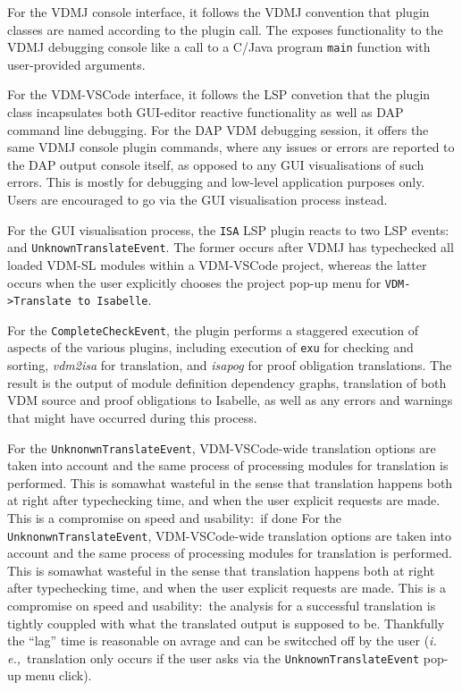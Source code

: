 \documentclass[runningheads,a4paper]{llncs}
\newcommand{\ie}{{\em i.\,e.,\/}}
\begin{document}
For the VDMJ console interface, it follows the VDMJ convention that plugin classes are named according to the plugin call. The exposes functionality to the VDMJ debugging console like a call to a C/Java program \texttt{main} function with user-provided arguments.   

For the VDM-VSCode interface, it follows the LSP convetion that the plugin class incapsulates both GUI-editor reactive functionality as well as DAP command line debugging. For the DAP VDM debugging session, it offers the same VDMJ console plugin commands, where any issues or errors are reported to the DAP output console itself, as opposed to any GUI visualisations of such errors. This is mostly for debugging and low-level application purposes only. Users are encouraged to go via the GUI visualisation process instead. 

For the GUI visualisation process, the \texttt{ISA} LSP plugin reacts to two LSP events:~ and \texttt{UnknownTranslateEvent}. The former occurs after VDMJ has typechecked all loaded VDM-SL modules within a VDM-VSCode project, whereas the latter occurs when the user explicitly chooses the project pop-up menu for \verb'VDM->Translate to Isabelle'. 

For the \texttt{CompleteCheckEvent}, the plugin performs a staggered execution of aspects of the various plugins, including execution of \texttt{exu} for checking and sorting, \textit{vdm2isa} for translation, and \textit{isapog} for proof obligation translations. The result is the output of module definition dependency graphs, translation of both VDM source and proof obligations to Isabelle, as well as any errors and warnings that might have occurred during this process. 

For the \texttt{UnknonwnTranslateEvent}, VDM-VSCode-wide translation options are taken into account and the same process of processing modules for translation is performed. This is somawhat wasteful in the sense that translation happens both at right after typechecking time, and when the user explicit requests are made. This is a compromise on speed and usability:~if done  
For the \texttt{UnknonwnTranslateEvent}, VDM-VSCode-wide translation options are taken into account and the same process of processing modules for translation is performed. This is somawhat wasteful in the sense that translation happens both at right after typechecking time, and when the user explicit requests are made. This is a compromise on speed and usability:~the analysis for a successful translation is tightly couppled with what the translated output is supposed to be. Thankfully the ``lag'' time is reasonable on avrage and can be switcched off by the user (\ie~translation only occurs if the user asks via the \texttt{UnknownTranslateEvent} pop-up menu click). 
\end{document}
